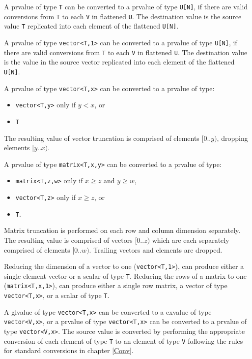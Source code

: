 \p A prvalue of type \texttt{T} can be converted to a
prvalue of type \texttt{U[N]}, if there are valid conversions from
\texttt{T} to each \texttt{V} in flattened \texttt{U}. The destination value
is the source value \texttt{T} replicated into each element of the flattened
\texttt{U[N]}.

\p A prvalue of type \texttt{vector<T,1>} can be converted to a
prvalue of type \texttt{U[N]}, if there are valid conversions from
\texttt{T} to each \texttt{V} in flattened \texttt{U}. The destination value
is the value in the source vector replicated into each element of the flattened
\texttt{U[N]}.


\p A prvalue of type \texttt{vector<T,x>} can be converted to a prvalue of type:
\begin{itemize}
\item \texttt{vector<T,y>} only if \( y < x \), or
\item \texttt{T}
\end{itemize}

\p The resulting value of vector truncation is comprised of elements \( [0..y)
\), dropping elements \( [y..x) \).

\p A prvalue of type \texttt{matrix<T,x,y>} can be converted to a prvalue of
type:
\begin{itemize}
  \item \texttt{matrix<T,z,w>} only if \( x \geq z \) and \(y \geq w \),
  \item \texttt{vector<T,z>} only if \( x \geq z \), or
  \item \texttt{T}.
\end{itemize}

\p Matrix truncation is performed on each row and column dimension separately.
The resulting value is comprised of vectors \( [0..z) \) which are each
separately comprised of elements \( [0..w) \). Trailing vectors and elements are
dropped.

\p Reducing the dimension of a vector to one (\texttt{vector<T,1>}), can produce
either a single element vector or a scalar of type \texttt{T}. Reducing the
rows of a matrix to one (\texttt{matrix<T,x,1>}), can produce either a single
row matrix, a vector of type \texttt{vector<T,x>}, or a scalar of type
\texttt{T}.


\p A glvalue of type \texttt{vector<T,x>} can be converted to a cxvalue of type
\texttt{vector<V,x>}, or a prvalue of type \texttt{vector<T,x>} can be converted
to a prvalue of type \texttt{vector<V,x>}. The source value is converted by
performing the appropriate conversion of each element of type \texttt{T} to an
element of type \texttt{V} following the rules for standard conversions
in chapter \ref{Conv}.

